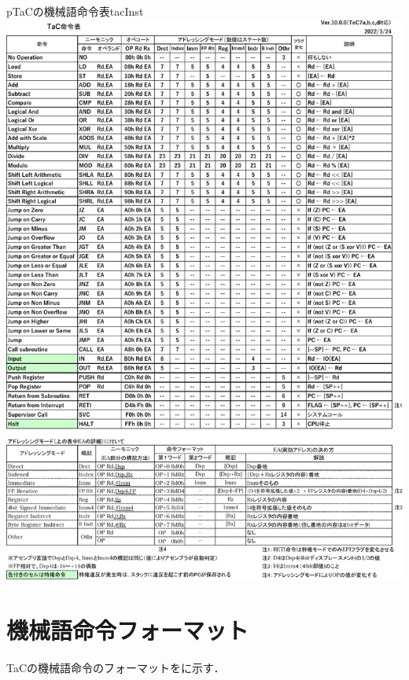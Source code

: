 \begin{myfig}{p}{TaCの機械語命令表}{tacInst}
  \includegraphics[scale=0.88,page=1]{Fig/TacInst-crop.pdf}
\end{myfig}

\section{機械語命令フォーマット}
TaCの機械語命令のフォーマットをに示す．

